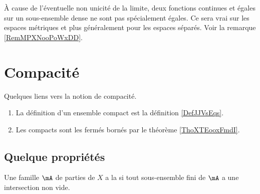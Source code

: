 \begin{remark}
    À cause de l'éventuelle non unicité de la limite, deux fonctions continues et égales sur un sous-ensemble dense ne sont pas spécialement égales. Ce sera vrai sur les espaces métriques et plus généralement pour les espaces séparés. Voir la remarque \ref{RemMPXNooPoWxDD}.
\end{remark}

\section{Compacité}

Quelques liens vers la notion de compacité.
\begin{enumerate}
    \item
        La définition d'un ensemble compact est la définition \ref{DefJJVsEqs}.
    \item
        Les compacts sont les fermés bornés par le théorème \ref{ThoXTEooxFmdI}.
\end{enumerate}

\subsection{Quelque propriétés}

\begin{definition}
    Une famille \( \mA\) de parties de \( X\) a la  si tout sous-ensemble fini de \( \mA\) a une intersection non vide.
\end{definition}

